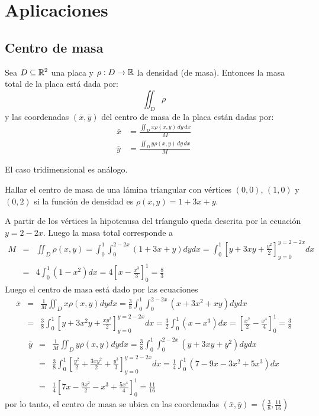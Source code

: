

\section{Aplicaciones}

\subsection{Centro de masa}

Sea $ D \subseteq \mathbb{R}^2 $ una placa y $ \rho : D \to \mathbb{R} $ la densidad (de masa). Entonces la masa total de la placa est\'a dada por:
\[
    \iint_D \rho
\]
y las coordenadas $(\bar x, \bar y) $ del centro de masa de la placa est\'an dadas por:
\begin{align*}
\bar x &= \frac{\iint_D x \rho(x,y) \,dy\,dx}{M} \\
\bar y &= \frac{\iint_D y \rho(x,y) \,dy\,dx}{M}
\end{align*}

El caso tridimensional es an\'alogo.

\begin{ejemplo}
Hallar el centro de masa de una l\'amina triangular con v\'ertices $(0,0)$, $(1,0)$ y $(0,2)$ si la funci\'on de densidad es $\rho(x,y)=1+3x+y$.
\end{ejemplo}

\medskip

\begin{solucion}
A partir de los v\'ertices la hipotenusa del tr\'iangulo queda descrita por la ecuaci\'on $y=2-2x$. Luego la masa total corresponde a
\begin{eqnarray*}
M &=& \iint_D \rho(x,y) = \int_{0}^{1} \int_{0}^{2-2x} (1+3x+y) dy dx = \int_0^1 \left[y+3xy+\frac{y^2}{2} \right]_{y=0}^{y=2-2x} dx \\
&=& 4\int_0^1 (1-x^2)dx = 4\left[x-\frac{x^3}{3} \right]_0^1 = \frac{8}{3}
\end{eqnarray*}
Luego el centro de masa est\'a dado por las ecuaciones
\begin{eqnarray*}
\bar{x} &=& \frac{1}{M} \iint_D x\rho(x,y) dy dx = \frac{3}{8} \int_0^1 \int_0^{2-2x} (x+3x^2+xy) dy dx \\
&=& \frac{3}{8} \int_0^1 \left[y+3x^2y+\frac{xy^2}{2} \right]_{y=0}^{y=2-2x} dx = \frac{3}{2} \int_0^1 (x-x^3) dx = \left[\frac{x^2}{2}-\frac{x^4}{4} \right]_0^1 = \frac{3}{8}
\end{eqnarray*}
\begin{eqnarray*}
\bar{y} &=& \frac{1}{M} \iint_D y\rho(x,y) dy dx = \frac{3}{8} \int_0^1 \int_0^{2-2x} (y+3xy+y^2) dy dx \\
&=& \frac{3}{8} \int_0^1 \left[\frac{y^2}{2}+\frac{3xy^2}{2}+\frac{y^3}{3} \right]_{y=0}^{y=2-2x} dx = \frac{1}{4} \int_0^1 (7-9x-3x^2+5x^3) dx \\
&=& \frac{1}{4} \left[7x-\frac{9x^2}{2}-x^3+\frac{5x^4}{4} \right]_0^1 = \frac{11}{16}
\end{eqnarray*}
por lo tanto, el centro de masa se ubica en las coordenadas $(\bar{x},\bar{y})=(\frac{3}{8},\frac{11}{16})$
\end{solucion}

